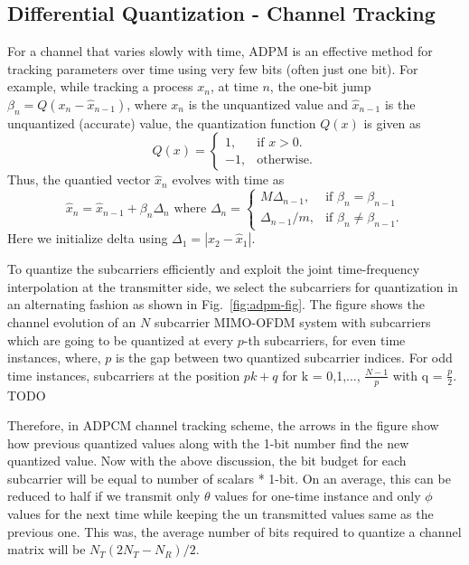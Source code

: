 \documentclass[conference]{IEEEtran}
\begin{document}
\subsection{Differential Quantization - Channel Tracking}
\label{quantiz}
For a channel that varies slowly with time, ADPM is an effective
method for tracking parameters over time using very few bits (often
just one bit). For example, while tracking a process $x_n$, at time
$n$, the one-bit jump $\beta_{n} = Q(x_{n} - \hat{x}_{n-1})$, where
$x_n$ is the unquantized value and $\hat{x}_{n-1}$ is the unquantized
(accurate) value, the quantization function $Q(x)$ is given as
\begin{equation}
  Q(x)=\begin{cases}
    1, & \text{if $x>0$}.\\
    -1, & \text{otherwise}.
  \end{cases}
\end{equation}
Thus, the quantied vector $\hat{x}_n$ evolves with time as
\begin{equation}
\hat{x}_{n} = \hat{x}_{n-1} + \beta_{n}\Delta_{n} \mbox{ where }
\label{delta_eqn}
\Delta_{n} = \begin{cases}
    M \Delta_{n-1}, & \text{if $\beta_{n} = \beta_{n-1}$}\\
    \Delta_{n-1}/m , & \text{if $\beta_{n} \neq \beta_{n-1}$}.
  \end{cases}
\end{equation}
Here we initialize delta using $\Delta_1 = |x_{2}-\hat{x}_1|$.

To quantize the subcarriers efficiently and exploit the joint
time-frequency interpolation at the transmitter side, we select the
subcarriers for quantization in an alternating fashion as shown in
Fig.~\ref{fig:adpm-fig}. The figure shows the channel evolution of an
$N$ subcarrier MIMO-OFDM system with subcarriers which are going to be
quantized at every $p$-th subcarriers, for even time instances, where,
$p$ is the gap between two quantized subcarrier indices. For odd time
instances, subcarriers at the position $pk+q$ for k = 0,1,...,
$\frac{N-1}{p}$ with q = ${\frac{p}{2}}$. TODO

Therefore, in ADPCM channel tracking scheme, the arrows in the figure show how previous quantized values along with the 1-bit number find the new quantized value. Now with the above discussion, the bit budget for each subcarrier will be equal to number of scalars * 1-bit. On an average, this can be reduced to half if we transmit only $\theta$ values for one-time instance and only $\phi$ values for the next time while keeping the un transmitted values same as the previous one. This was, the average number of bits required to quantize a channel matrix will be $N_{T}(2N_{T} - N_{R})/2$.
\end{document}
